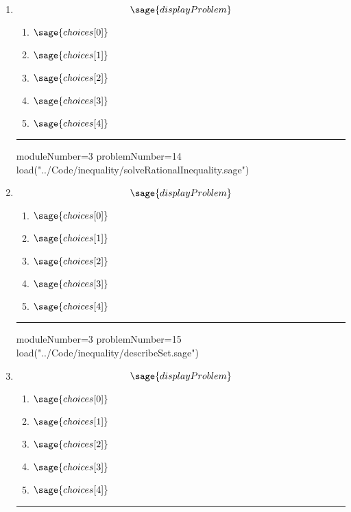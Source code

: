 \documentclass[14pt]{article}
\newcommand{\litem}[1]{\item#1\hspace*{-1cm}\rule{\textwidth}{0.4pt}}
\begin{document}
\begin{enumerate}
\litem{ 

\[ \sage{displayProblem} \]

	\begin{enumerate}[label=\Alph*.]
		\item \( \sage{choices[0]} \)
		\item \( \sage{choices[1]} \)
		\item \( \sage{choices[2]} \)
		\item \( \sage{choices[3]} \)
		\item \( \sage{choices[4]} \)
	\end{enumerate}

}

\begin{sagesilent}
moduleNumber=3
problemNumber=14
load("../Code/inequality/solveRationalInequality.sage")
\end{sagesilent}

\litem{ 

\[ \sage{displayProblem} \]

	\begin{enumerate}[label=\Alph*.]
    \item \( \sage{choices[0]} \)
    \item \( \sage{choices[1]} \)
    \item \( \sage{choices[2]} \)
    \item \( \sage{choices[3]} \)
    \item \( \sage{choices[4]} \)
	\end{enumerate}

}

\begin{sagesilent}
moduleNumber=3
problemNumber=15
load("../Code/inequality/describeSet.sage")
\end{sagesilent}
\litem{ 

\[ \sage{displayProblem} \]

	\begin{enumerate}[label=\Alph*.]
		\item \( \sage{choices[0]} \)
		\item \( \sage{choices[1]} \)
		\item \( \sage{choices[2]} \)
		\item \( \sage{choices[3]} \)
    \item \( \sage{choices[4]} \)
	\end{enumerate}

}

\end{enumerate}
\end{document}
